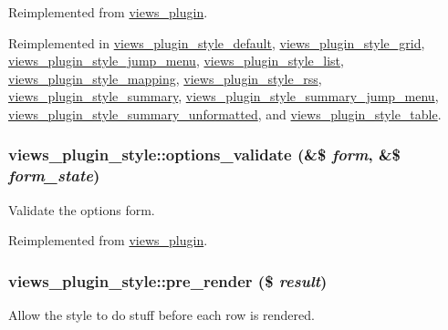 Reimplemented from \hyperlink{classviews__plugin_a1aaed8da1afd9f45293a37358c159837}{views\_\-plugin}.

Reimplemented in \hyperlink{classviews__plugin__style__default_a6d6eb45c613c5990a44b3071cb82b36d}{views\_\-plugin\_\-style\_\-default}, \hyperlink{classviews__plugin__style__grid_a275eb0e00406028e000268ae389d17a3}{views\_\-plugin\_\-style\_\-grid}, \hyperlink{classviews__plugin__style__jump__menu_ad7158f1d70c97809b44bfa0e10b11709}{views\_\-plugin\_\-style\_\-jump\_\-menu}, \hyperlink{classviews__plugin__style__list_a37ec2449bb2119e4a8c3730cd458ecdb}{views\_\-plugin\_\-style\_\-list}, \hyperlink{classviews__plugin__style__mapping_a3aa280e8dac5c6d0cdc33418bfa1736c}{views\_\-plugin\_\-style\_\-mapping}, \hyperlink{classviews__plugin__style__rss_a317b1867ddd97f969977368031e04fee}{views\_\-plugin\_\-style\_\-rss}, \hyperlink{classviews__plugin__style__summary_a43826183b4d54242ae5276f40f70475f}{views\_\-plugin\_\-style\_\-summary}, \hyperlink{classviews__plugin__style__summary__jump__menu_ab66730cfcd70ef23a0dbc05e80ad3d32}{views\_\-plugin\_\-style\_\-summary\_\-jump\_\-menu}, \hyperlink{classviews__plugin__style__summary__unformatted_a8770285dac047bf88a2c77b2e798826d}{views\_\-plugin\_\-style\_\-summary\_\-unformatted}, and \hyperlink{classviews__plugin__style__table_a732752fb9b74bdb48673cb9ff4150be9}{views\_\-plugin\_\-style\_\-table}.\hypertarget{classviews__plugin__style_acdfd8cc26a594b82aaf56d205ac83b36}{
\subsubsection[{options\_\-validate}]{\setlength{\rightskip}{0pt plus 5cm}views\_\-plugin\_\-style::options\_\-validate (\&\$ {\em form}, \/  \&\$ {\em form\_\-state})}}
\label{classviews__plugin__style_acdfd8cc26a594b82aaf56d205ac83b36}
Validate the options form. 

Reimplemented from \hyperlink{classviews__plugin_a46d72eb35feea36fed83cd1355a47431}{views\_\-plugin}.\hypertarget{classviews__plugin__style_a9d35c181b927a52d8bf34ac629b05d20}{
\subsubsection[{pre\_\-render}]{\setlength{\rightskip}{0pt plus 5cm}views\_\-plugin\_\-style::pre\_\-render (\$ {\em result})}}
\label{classviews__plugin__style_a9d35c181b927a52d8bf34ac629b05d20}
Allow the style to do stuff before each row is rendered.


